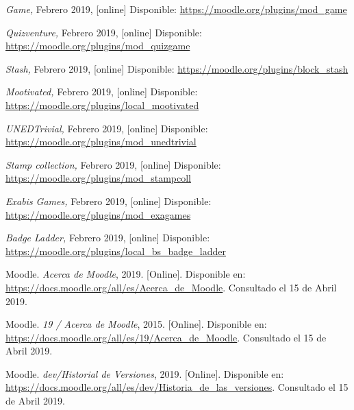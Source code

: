 \begin{thebibliography}{9}
        \textit{Game,}
        Febrero 2019, [online] Disponible:  
        \url{https://moodle.org/plugins/mod_game}
        
        \textit{Quizventure,}
        Febrero 2019, [online] Disponible:  
        \url{https://moodle.org/plugins/mod_quizgame}
        
        \textit{Stash,}
        Febrero 2019, [online] Disponible:  
        \url{https://moodle.org/plugins/block_stash}
    
        \textit{Mootivated,}
        Febrero 2019, [online] Disponible:  
        \url{https://moodle.org/plugins/local_mootivated}
    
        \textit{UNEDTrivial,}
        Febrero 2019, [online] Disponible:  
        \url{https://moodle.org/plugins/mod_unedtrivial}
    
        \textit{Stamp collection,}
        Febrero 2019, [online] Disponible:  
        \url{https://moodle.org/plugins/mod_stampcoll}
    
        \textit{Exabis Games,}
        Febrero 2019, [online] Disponible:  
        \url{https://moodle.org/plugins/mod_exagames}
    
        \textit{Badge Ladder,}
        Febrero 2019, [online] Disponible:  
        \url{https://moodle.org/plugins/local_bs_badge_ladder}


        Moodle. {\it Acerca de Moodle}, 2019. [Online]. Disponible en:
        \url{https://docs.moodle.org/all/es/Acerca_de_Moodle}. Consultado el 15 de Abril 2019.
    
        Moodle. {\it 19 / Acerca de Moodle}, 2015. [Online]. Disponible en:
        \url{https://docs.moodle.org/all/es/19/Acerca_de_Moodle}. Consultado el 15 de Abril 2019.
    
        Moodle. {\it dev/Historial de Versiones}, 2019. [Online]. Disponible en:
        \url{https://docs.moodle.org/all/es/dev/Historia_de_las_versiones}. Consultado el 15 de Abril 2019.


\end{thebibliography}
